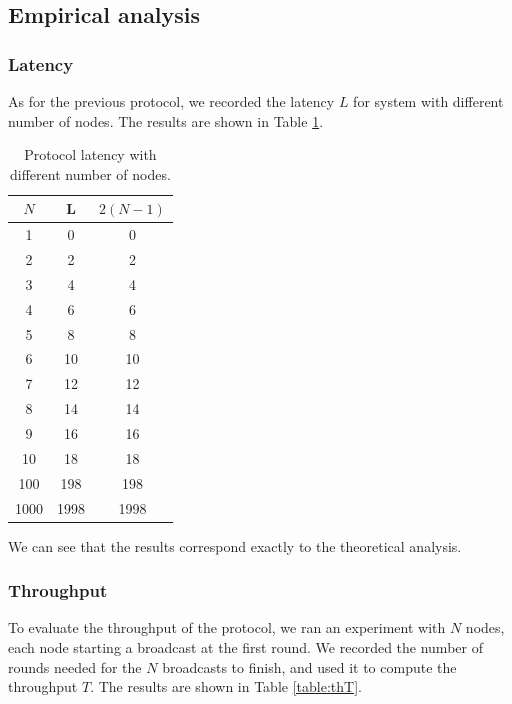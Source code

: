\documentclass[a4paper]{article}
\begin{document}
\subsection{Empirical analysis}
\subsubsection{Latency}
As for the previous protocol, we recorded the latency $L$ for system with
different number of nodes. The results are shown in Table \ref{table:th}.

\begin{table}[H]
    \centering
    \begin{tabular}{|c|c|c|}
        \hline
        $N$   & L   & $2(N-1)$ \\
        \hline
        1     & 0   & 0    \\
        2     & 2   & 2   \\
        3     & 4   & 4   \\
        4     & 6   & 6   \\
        5     & 8   & 8   \\
        6     & 10  & 10  \\
        7     & 12  & 12  \\
        8     & 14  & 14  \\
        9     & 16  & 16  \\
        10    & 18  & 18  \\
        100   & 198 & 198  \\
        1000  & 1998   & 1998  \\
        \hline
    \end{tabular}
    \caption{Protocol latency with different number of nodes.}
    \label{table:th}
\end{table}

We can see that the results correspond exactly to the theoretical analysis.

\subsubsection{Throughput}
To evaluate the throughput of the protocol, we ran an experiment with $N$
nodes, each node starting a broadcast at the first round. We recorded the
number of rounds needed for the $N$ broadcasts to finish, and used it to
compute the throughput $T$. The results are shown in Table \ref{table:thT}.
\end{document}
